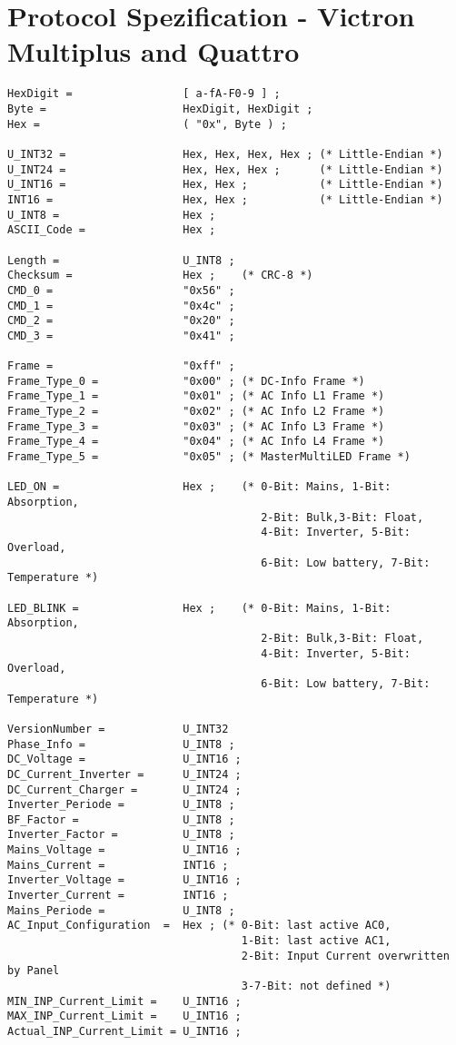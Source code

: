 \section{Protocol Spezification - Victron Multiplus and Quattro}
\label{VICTRONMULTIQUADEBNF}
\begin{verbatim}
HexDigit =                 [ a-fA-F0-9 ] ;
Byte =                     HexDigit, HexDigit ;
Hex =                      ( "0x", Byte ) ;

U_INT32 =                  Hex, Hex, Hex, Hex ; (* Little-Endian *)
U_INT24 =                  Hex, Hex, Hex ;      (* Little-Endian *)
U_INT16 =                  Hex, Hex ;           (* Little-Endian *)
INT16 =                    Hex, Hex ;           (* Little-Endian *)
U_INT8 =                   Hex ;
ASCII_Code =               Hex ;

Length =                   U_INT8 ;
Checksum =                 Hex ;    (* CRC-8 *)
CMD_0 =                    "0x56" ;
CMD_1 =                    "0x4c" ;
CMD_2 =                    "0x20" ;
CMD_3 =                    "0x41" ;

Frame =                    "0xff" ;
Frame_Type_0 =             "0x00" ; (* DC-Info Frame *)
Frame_Type_1 =             "0x01" ; (* AC Info L1 Frame *)
Frame_Type_2 =             "0x02" ; (* AC Info L2 Frame *)
Frame_Type_3 =             "0x03" ; (* AC Info L3 Frame *)
Frame_Type_4 =             "0x04" ; (* AC Info L4 Frame *)
Frame_Type_5 =             "0x05" ; (* MasterMultiLED Frame *)

LED_ON =                   Hex ;    (* 0-Bit: Mains, 1-Bit: Absorption,
                                       2-Bit: Bulk,3-Bit: Float, 
                                       4-Bit: Inverter, 5-Bit: Overload, 
                                       6-Bit: Low battery, 7-Bit: Temperature *)

LED_BLINK =                Hex ;    (* 0-Bit: Mains, 1-Bit: Absorption,
                                       2-Bit: Bulk,3-Bit: Float, 
                                       4-Bit: Inverter, 5-Bit: Overload, 
                                       6-Bit: Low battery, 7-Bit: Temperature *)

VersionNumber =            U_INT32
Phase_Info =               U_INT8 ;
DC_Voltage =               U_INT16 ;
DC_Current_Inverter =      U_INT24 ;
DC_Current_Charger =       U_INT24 ;
Inverter_Periode =         U_INT8 ;
BF_Factor =                U_INT8 ;
Inverter_Factor =          U_INT8 ;
Mains_Voltage =            U_INT16 ;
Mains_Current =            INT16 ;
Inverter_Voltage =         U_INT16 ;
Inverter_Current =         INT16 ;
Mains_Periode =            U_INT8 ;
AC_Input_Configuration  =  Hex ; (* 0-Bit: last active AC0, 
                                    1-Bit: last active AC1, 
                                    2-Bit: Input Current overwritten by Panel
                                    3-7-Bit: not defined *)
MIN_INP_Current_Limit =    U_INT16 ;
MAX_INP_Current_Limit =    U_INT16 ;
Actual_INP_Current_Limit = U_INT16 ; 


\end{verbatim}

